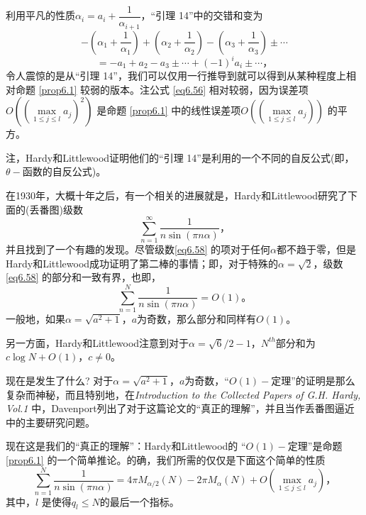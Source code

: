 \documentclass[11pt,a4paper]{article}
\theoremstyle{definition}
\newcommand{\refeq}[1]{公式 \ref{#1}}
\newcommand{\refprop}[1]{命题 \ref{#1}}
\numberwithin{equation}{section}
\newcommand{\comma}{\text{，}}
\newcommand{\juhao}{\text{。}}
\newcommand{\myone}[1]{\left(-1\right)^{#1}}
\begin{document}
利用平凡的性质$ \alpha_{i}=a_{i}+\dfrac{1}{\alpha_{i+1}} $，``引理 14''中的交错和变为
\[ -\left(\alpha_{1}+\dfrac{1}{\alpha_{1}}\right)+\left(\alpha_{2}+\dfrac{1}{\alpha_{2}}\right)-\left(\alpha_{3}+\dfrac{1}{\alpha_{3}}\right)\pm\cdots \]
\begin{equation}\label{eq6.57}
=-a_{1}+a_{2}-a_{3}\pm\cdots+\myone{i}a_{i}\pm\cdots\comma
\end{equation}
令人震惊的是从``引理 14''，我们可以仅用一行推导到就可以得到从某种程度上相对\refprop{prop6.1} 较弱的版本。注\refeq{eq6.56} 相对较弱，因为误差项$ O\left((\underset{1\leq j\leq l}{\max}a_{j})^{2}\right) $ 是\refprop{prop6.1} 中的线性误差项$ O\left((\underset{1\leq j\leq l}{\max}a_{j})\right) $ 的平方。

注，Hardy和Littlewood证明他们的``引理 14''是利用的一个不同的自反公式(即，$\theta-$函数的自反公式)。

在1930年，大概十年之后，有一个相关的进展就是，Hardy和Littlewood\cite{Ha-Li3}研究了下面的(丢番图)级数
\begin{equation}\label{eq6.58}
	\sum_{n=1}^{\infty}\dfrac{1}{n\sin\left(\pi n\alpha\right)}\comma
\end{equation}
并且找到了一个有趣的发现。尽管级数\ref{eq6.58} 的项对于任何$ \alpha $都不趋于零，但是Hardy和Littlewood成功证明了第二棒的事情；即，对于特殊的$ \alpha=\sqrt{2} $，级数\ref{eq6.58} 的部分和一致有界，也即，
\begin{equation}\label{eq6.59}
\sum_{n=1}^{N}\dfrac{1}{n\sin\left(\pi n\alpha\right)}=O\left(1\right)\juhao 
\end{equation}
一般地，如果$ \alpha=\sqrt{a^{2}+1}\comma a $为奇数，那么部分和同样有$ O\left(1\right) $。

另一方面，Hardy和Littlewood注意到对于$ \alpha=\sqrt{6}/2-1 $，$ N^{th} $部分和为$ c\log N+ O\left(1\right)\comma c\neq0$。

现在是发生了什么? 对于$ \alpha=\sqrt{a^{2}+1}\comma a $为奇数，``$ O\left(1\right)-$定理''的证明是那么复杂而神秘，而且特别地，在\textit{Introduction to the Collected Papers of G.H. Hardy, Vol.1} 中，Davenport列出了对于这篇论文的``真正的理解''，并且当作丢番图逼近中的主要研究问题。

现在这是我们的``真正的理解''：Hardy和Littlewood的 ``$ O\left(1\right)-$定理''是\refprop{prop6.1} 的一个简单推论。的确，我们所需的仅仅是下面这个简单的性质
\begin{equation}\label{eq6.60}
\sum_{n=1}^{N}\dfrac{1}{n\sin\left(\pi n\alpha\right)}=4\pi M_{\alpha/2}\left(N\right)-2\pi M_{\alpha}\left(N\right)+O\left(\underset{1\leq j\leq l}{\max}a_{j}\right)\comma
\end{equation}
其中，$ l $ 是使得$ q_{l}\leq N $的最后一个指标。
\end{document}
